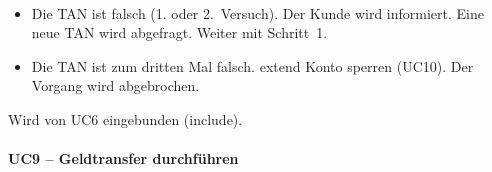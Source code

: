 \documentclass[12pt]{scrartcl}
\newcommand{\umark}[1]{\guillemotleft #1\guillemotright}
\begin{document}
\begin{description}[leftmargin=4.5cm, style=nextline, font=\normalfont\bfseries]
  \item[Alternativablauf:]~
  \begin{itemize}
      \item[(3')] Die TAN ist falsch (1. oder 2.\ Versuch). Der Kunde wird
      informiert. Eine neue TAN wird abgefragt. Weiter mit Schritt~1.
      \item[(3'')] Die TAN ist zum dritten Mal falsch.
      \umark{extend} Konto sperren (UC10). Der Vorgang wird abgebrochen.
  \end{itemize}

  \item[Beziehung:]
  Wird von UC6 eingebunden (\umark{include}).
    \end{description}

    \paragraph{UC9 -- Geldtransfer durchf\"uhren}~\\[4pt]
\end{document}
